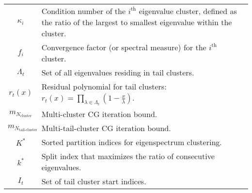 \begin{longtable}{c p{10cm}}
    $\kappa_i$                       & Condition number of the $i^\text{th}$ eigenvalue cluster, defined as the ratio of the largest to smallest eigenvalue within the cluster.                  \\
    $f_i$                            & Convergence factor (or spectral measure) for the $i^\text{th}$ cluster.                                                                                   \\
    $\Lambda_t$                      & Set of all eigenvalues residing in tail clusters.                                                                                                         \\
    $r_t(x)$                         & Residual polynomial for tail clusters: $r_t(x) = \prod_{\lambda\in\Lambda_t} \left(1 - \frac{x}{\lambda}\right)$.                                         \\
    $m_{N_{\text{cluster}}}$         & Multi-cluster CG iteration bound.                                                                                                                         \\
    $m_{N_{\text{tail-cluster}}}$    & Multi-tail-cluster CG iteration bound.                                                                                                                    \\
    $K^*$                            & Sorted partition indices for eigenspectrum clustering.                                                                                                    \\
    $k^*$                            & Split index that maximizes the ratio of consecutive eigenvalues.                                                                                          \\
    $I_t$                            & Set of tail cluster start indices.                                                                                                                        \\
\end{longtable}

